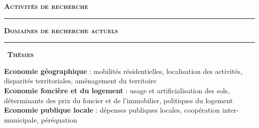 \documentclass[a4paper,12pt]{article}
\newcommand{\bigtitre}[1]{%
	\begin{center}
		\textbf{\LARGE \textsc{#1}}
	\end{center}
	\medskip
	}
\newcommand{\titre}[1]{%
	\bigskip
	\noindent \rule[2mm]{\textwidth}{0.5pt}
	\textbf{\textsc{\large #1}} \\
	\noindent \rule[1mm]{\textwidth}{0.5pt}
	}
\newcommand{\smalltitre}[1]{%
	\noindent \textbullet~\textsc{\textbf{#1}}
	\smallskip
	}
\begin{document}
\newpage



\bigtitre{Activités de recherche}


\titre{Domaines de recherche actuels}




\smalltitre{Thèmes} \smallskip

\noindent \textbf{Economie géographique} : mobilités résidentielles, localisation des activités, disparités territoriales, aménagement du territoire \smallskip \\ 
\textbf{Economie foncière et du logement} : usage et artificialisation des sols, déterminants des prix du foncier et de l'immobilier, politiques du logement \smallskip \\ 
\textbf{Economie publique locale} : dépenses publiques locales, coopération inter-municipale, péréquation \medskip \\ 
\end{document}
